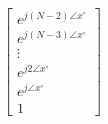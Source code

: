 \documentclass{article}
\begin{document}
\begin{align*}
\begin{bmatrix}
                                                        e^{j(N - 2)\angle{x}^{\circ}} \\
                                                        e^{j(N - 3)\angle{x}^{\circ}} \\
                                                        \vdots \\
                                                        e^{j2\angle{x}^{\circ}} \\
                                                        e^{j\angle{x}^{\circ}} \\
                                                        1
                                                      \end{bmatrix}
\end{align*}
\end{document}
